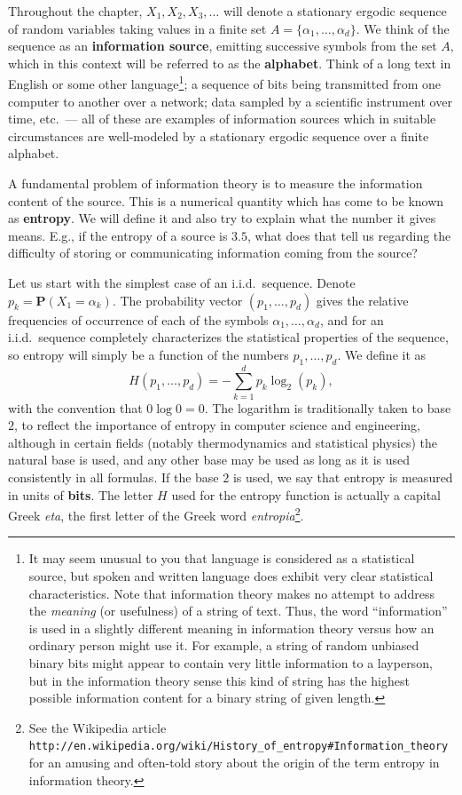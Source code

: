 \documentclass[12pt]{article}
\newcommand{\prob}{\mathbf{P}}
\theoremstyle{example}
\begin{document}
Throughout the chapter, $X_1,X_2,X_3,\ldots$ will denote a stationary ergodic sequence of random variables taking values in a finite set $A=\{\alpha_1,\ldots,\alpha_d \}$. We think of the sequence as an \textbf{information source}, emitting successive symbols from the set $A$, which in this context will be referred to as the \textbf{alphabet}. Think of a long text in English or some other language\footnote{It may seem unusual to you that language is considered as a statistical source, but spoken and written language does exhibit very clear statistical characteristics. Note that information theory makes no attempt to address the \emph{meaning} (or usefulness) of a string of text. Thus, the word ``information'' is used in a slightly different meaning in information theory versus how an ordinary person might use it. For example, a string of random unbiased binary bits might appear to contain very little information to a layperson, but in the information theory sense this kind of string has the highest possible information content for a binary string of given length.}; a sequence of bits being transmitted from one computer to another over a network; data sampled by a scientific instrument over time, etc.\ --- all of these are examples of information sources which in suitable circumstances are well-modeled by a stationary ergodic sequence over a finite alphabet. 

A fundamental problem of information theory is to measure the information content of the source. This is a numerical quantity which has come to be known as \textbf{entropy}. We will define it and also try to explain what the number it gives means. E.g., if the entropy of a source is $3.5$, what does that tell us regarding the difficulty of storing or communicating information coming from the source?

Let us start with the simplest case of an i.i.d.\ sequence. Denote $p_k = \prob(X_1 = \alpha_k)$. The probability vector $(p_1,\ldots,p_d)$ gives the relative frequencies of occurrence of each of the symbols $\alpha_1,\ldots,\alpha_d$, and for an i.i.d.\ sequence completely characterizes the statistical properties of the sequence, so entropy will simply be a function of the numbers $p_1,\ldots,p_d$. We define it as
$$ H(p_1,\ldots,p_d) = -\sum_{k=1}^d p_k \log_2(p_k), $$
with the convention that $0\log 0 = 0$.
The logarithm is traditionally taken to base $2$, to reflect the importance of entropy in computer science and engineering, although in certain fields (notably thermodynamics and statistical physics) the natural base is used, and any other base may be used as long as it is used consistently in all formulas. If the base $2$ is used, we say that entropy is measured in units of \textbf{bits}. The letter $H$ used for the entropy function is actually a capital Greek \emph{eta}, the first letter of the Greek word \emph{entropia}\footnote{See the Wikipedia article 
\texttt{http://en.wikipedia.org/wiki/History\_of\_entropy\#Information\_theory}
for an amusing and often-told story about the origin of the term entropy in information theory.}.
\end{document}
